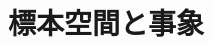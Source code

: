 \documentclass[../../topic_probability-statistics]{subfiles}
\begin{document}
\chapter{標本空間と事象}



\end{document}
